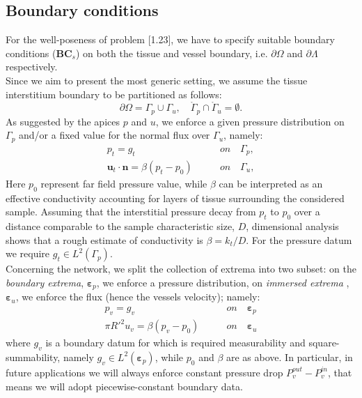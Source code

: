 \documentclass[a4paper]{report}
\begin{document}
\subsection{Boundary conditions}
For the well-poseness of problem [1.23], we have to specify suitable boundary conditions ($\mathbf{BC}_s$) on both the tissue and vessel boundary, i.e. $\partial \Omega$ and $\partial \Lambda$ respectively.\\
Since we aim to present the most generic setting, we assume the tissue interstitium boundary to be partitioned as follows:
\begin{equation}
\partial \Omega= \Gamma_p \cup \Gamma_u, \quad \mathring{\Gamma}_p \cap \mathring{\Gamma}_u=\emptyset.
\end{equation}
As suggested by the apices $p$ and $u$, we enforce a given pressure distribution on $\Gamma_p$ and/or a fixed value for the normal flux over $\Gamma_u$, namely:
\begin{align}
p_t=g_t \quad & \quad on \quad \Gamma_p,\\
\mathbf{u}_t \cdot \mathbf{n}=\beta (p_t - p_0 ) \quad & \quad on\quad \Gamma_u,
\end{align}
Here $p_0$ represent far field pressure value, while $\beta$ can be interpreted as an effective conductivity accounting for layers of tissue surrounding the considered sample. Assuming that the interstitial pressure decay from $p_t$ to $p_0$ over a distance comparable to the sample characteristic size, $D$, dimensional analysis shows that a rough estimate of conductivity is $\beta= k_t/D$. For the pressure datum we require $g_t \in L^2(\Gamma_p)$.\\
Concerning the network, we split the collection of extrema into two subset: on the \textit{boundary extrema}, $\boldsymbol{\varepsilon}_p$, we enforce a pressure distribution, on \textit{immersed extrema} ,  $\boldsymbol{\varepsilon}_u$, we enforce the flux (hence the vessels velocity); namely:
\begin{align}
 p_v=g_v \quad \quad & \quad \quad on \quad \boldsymbol{\varepsilon}_p\\
\pi R'^2 u_v =\beta (p_v-p_0)&\quad \quad on \quad \boldsymbol{\varepsilon}_u
\end{align}
where $g_v$ is a boundary datum for which is required measurability and square-summability, namely $g_v \in L^2(\boldsymbol{\varepsilon}_p)$, while $p_0$ and $\beta$ are as above. In particular, in future applications we will always enforce constant pressure drop $P^{out}_v-P^{in}_v$, that means we will adopt piecewise-constant boundary data.
\end{document}
